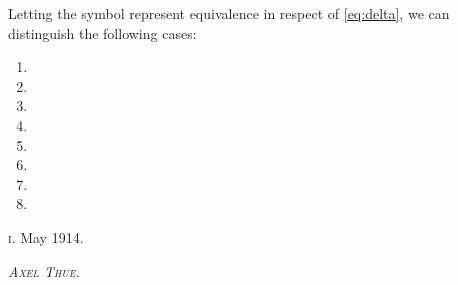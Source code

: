 Letting the symbol  represent equivalence in respect of
\eqref{eq:delta}, we can distinguish the following
cases:

\begin{enumerate}
\item 

\bigskip

\item 

\item 

\bigskip

\item 

\bigskip

\item 

\bigskip

\item 



\bigskip

\item 

\bigskip


\item 

\end{enumerate}

\bigskip
\noindent
\textsc{i}. May 1914.

\hfill \textsc{\large{\emph{Axel Thue.}}}

\begin{center}
\begin{tabular}{p{}}
\\ \hline\hline
\end{tabular}
\end{center}





